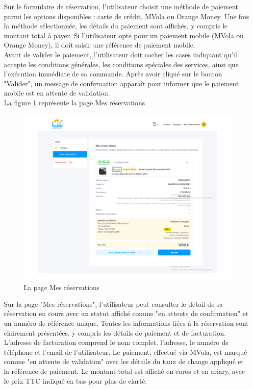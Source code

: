 \documentclass[12pt]{report}
\begin{document}
			Sur le formulaire de réservation, l'utilisateur choisit une méthode de paiement parmi les options disponibles : carte de crédit, MVola ou Orange Money. Une fois la méthode sélectionnée, les détails du paiement sont affichés, y compris le montant total à payer. Si l'utilisateur opte pour un paiement mobile (MVola ou Orange Money), il doit saisir une référence de paiement mobile.\\

Avant de valider le paiement, l'utilisateur doit cocher les cases indiquant qu'il accepte les conditions générales, les conditions spéciales des services, ainsi que l'exécution immédiate de sa commande. Après avoir cliqué sur le bouton "Valider", un message de confirmation apparaît pour informer que le paiement mobile est en attente de validation.\\

			La figure \ref{fig:mesReservationPage} représente la page Mes réservations

			\begin{figure}[h]
				\centering
				\includegraphics[width=\textwidth]{mesReservationPage.png}
				\caption{ La page Mes réservations}
				\label{fig:mesReservationPage}
			\end{figure}
			\FloatBarrier

		
			Sur la page "Mes réservations", l'utilisateur peut consulter le détail de sa réservation en cours avec un statut affiché comme "en attente de confirmation" et un numéro de référence unique. Toutes les informations liées à la réservation sont clairement présentées, y compris les détails de paiement et de facturation. L'adresse de facturation comprend le nom complet, l'adresse, le numéro de téléphone et l'email de l'utilisateur. Le paiement, effectué via MVola, est marqué comme "en attente de validation" avec les détails du taux de change appliqué et la référence de paiement. Le montant total est affiché en euros et en ariary, avec le prix TTC indiqué en bas pour plus de clarté.\\
\end{document}
